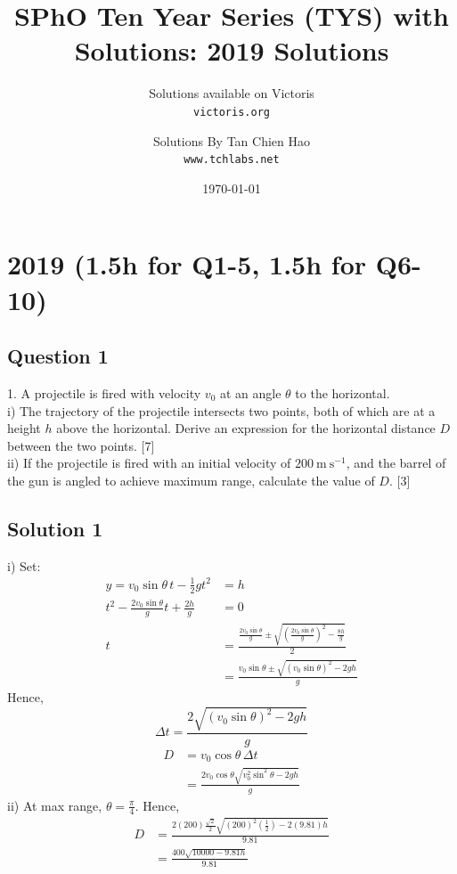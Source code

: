 \documentclass{article}
\title{SPhO Ten Year Series (TYS) with Solutions: 2019 Solutions}
\author{
    Solutions available on Victoris\\
    \texttt{victoris.org}
    \and 
    Solutions By Tan Chien Hao\\
    \texttt{www.tchlabs.net}
}
\date{\today}
\begin{document}
\maketitle

\section{2019 (1.5h for Q1-5, 1.5h for Q6-10)}
\subsection{Question 1}
1. A projectile is fired with velocity $v_{0}$ at an angle $\theta$ to the horizontal. \\
i) The trajectory of the projectile intersects two points, both of which are at a height $h$ above the horizontal. Derive an expression for the horizontal distance $D$ between the two points. [7]  \\
ii) If the projectile is fired with an initial velocity of $200 \mathrm{~m} \mathrm{~s}^{-1}$, and the barrel of the gun is angled to achieve maximum range, calculate the value of $D$. [3]
\subsection{Solution 1}
i) Set:
\begin{align*}
    y=v_0\sin \theta\,t-\frac{1}{2}gt^2&=h\\
    t^2-\frac{2v_0\sin \theta}{g}t+\frac{2h}{g}&=0\\
    t&=\frac{\frac{2v_0\sin \theta}{g}\pm\sqrt{\left(\frac{2v_0\sin \theta}{g}\right)^2-\frac{8h}{g}}}{2}\\
    &=\frac{v_0\sin \theta\pm\sqrt{\left(v_0\sin \theta\right)^2-2gh}}{g}
\end{align*}
Hence,
\[\Delta t=\frac{2\sqrt{\left(v_0\sin \theta\right)^2-2gh}}{g}\]
\begin{align*}
    D&=v_0\cos\theta\,\Delta t\\
    &=\frac{2v_0\cos \theta\sqrt{v_0^2\sin^2\theta-2gh}}{g}
\end{align*}
ii) At max range, \(\theta=\frac{\pi}{4}\). Hence,
\begin{align*}
    D&=\frac{2(200)\frac{\sqrt{2}}{2}\sqrt{(200)^2(\frac{1}{2})-2(9.81)h}}{9.81}\\
    &=\frac{400\sqrt{10000-9.81h}}{9.81}
\end{align*}
\end{document}
